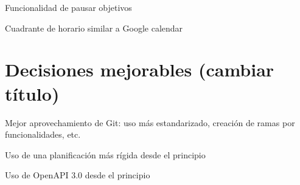 \documentclass[10pt, a4paper]{aqademic}
\begin{document}
Funcionalidad de pausar objetivos

Cuadrante de horario similar a Google calendar


\section{Decisiones mejorables (cambiar título)}

Mejor aprovechamiento de Git: uso más estandarizado, creación de ramas por funcionalidades, etc.

Uso de una planificación más rígida desde el principio

Uso de OpenAPI 3.0 desde el principio


\newpage



\end{document}

